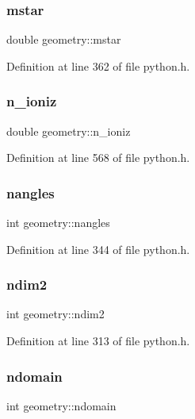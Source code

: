 \subsubsection{\texorpdfstring{mstar}{mstar}}
{\footnotesize\ttfamily double geometry\+::mstar}



Definition at line 362 of file python.\+h.

\mbox{\label{structgeometry_abe1f88e34b47518ef744a2345c518f5a}} 
\subsubsection{\texorpdfstring{n\+\_\+ioniz}{n\_ioniz}}
{\footnotesize\ttfamily double geometry\+::n\+\_\+ioniz}



Definition at line 568 of file python.\+h.

\mbox{\label{structgeometry_a15530f8a501f4fad4572e8e751707af9}} 
\subsubsection{\texorpdfstring{nangles}{nangles}}
{\footnotesize\ttfamily int geometry\+::nangles}



Definition at line 344 of file python.\+h.

\mbox{\label{structgeometry_a6f369fbf8e117ef039235b7f20d04e32}} 
\subsubsection{\texorpdfstring{ndim2}{ndim2}}
{\footnotesize\ttfamily int geometry\+::ndim2}



Definition at line 313 of file python.\+h.

\mbox{\label{structgeometry_a781ad48d18a8d675b84414f1ba7a352d}} 
\subsubsection{\texorpdfstring{ndomain}{ndomain}}
{\footnotesize\ttfamily int geometry\+::ndomain}



